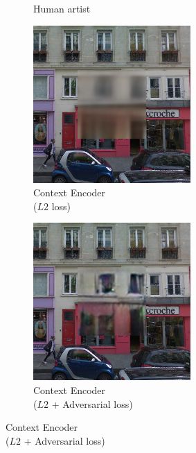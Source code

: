 \documentclass[preview]{standalone}
\begin{document}
\begin{figure}
\begin{subfigure}[b]{.49\columnwidth}
    \caption{Human artist}
  \end{subfigure}
\medskip 
  \begin{subfigure}[b]{.49\columnwidth}
    \centering
    \includegraphics[width=0.99\linewidth,height=0.99\linewidth]{figures/chapter02/0_merge_l2_overlap}
    \caption{Context Encoder\\($L2$ loss)}
  \end{subfigure}
  \begin{subfigure}[b]{.49\columnwidth}
    \centering
    \includegraphics[width=0.99\linewidth,height=0.99\linewidth]{figures/chapter02/paris_m21_full_0017_pred_highres}
    \caption{Context Encoder\\($L2$ + Adversarial loss)}
  \end{subfigure}
\end{figure}
\end{document}
